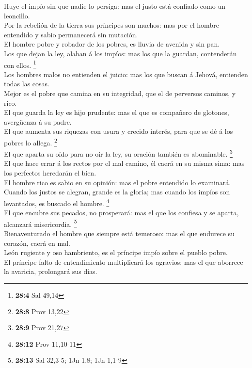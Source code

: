  Huye el impío sin que nadie lo persiga: mas el justo está
confiado como un leoncillo.\\
 Por la rebelión de la tierra sus príncipes son muchos: mas
por el hombre entendido y sabio permanecerá sin mutación.\\
 El hombre pobre y robador de los pobres, es lluvia de
avenida y sin pan.\\
 Los que dejan la ley, alaban á los impíos: mas los que la
guardan, contenderán con ellos. \footnote{\textbf{28:4} Sal 49,14}\\
 Los hombres malos no entienden el juicio: mas los que
buscan á Jehová, entienden todas las cosas.\\
 Mejor es el pobre que camina en su integridad, que el de
perversos caminos, y rico.\\
 El que guarda la ley es hijo prudente: mas el que es
compañero de glotones, avergüenza á su padre.\\
 El que aumenta sus riquezas con usura y crecido interés,
para que se dé á los pobres lo allega. \footnote{\textbf{28:8} Prov
  13,22}\\
 El que aparta su oído para no oir la ley, su oración
también es abominable. \footnote{\textbf{28:9} Prov 21,27}\\
 El que hace errar á los rectos por el mal camino, él caerá
en su misma sima: mas los perfectos heredarán el bien.\\
 El hombre rico es sabio en su opinión: mas el pobre
entendido lo examinará.\\
 Cuando los justos se alegran, grande es la gloria; mas
cuando los impíos son levantados, es buscado el hombre. \footnote{\textbf{28:12}
  Prov 11,10-11}\\
 El que encubre sus pecados, no prosperará: mas el que los
confiesa y se aparta, alcanzará misericordia. \footnote{\textbf{28:13}
  Sal 32,3-5; 1Jn 1,8; 1Jn 1,1-9}\\
 Bienaventurado el hombre que siempre está temeroso: mas el
que endurece su corazón, caerá en mal.\\
 León rugiente y oso hambriento, es el príncipe impío sobre
el pueblo pobre.\\
 El príncipe falto de entendimiento multiplicará los
agravios: mas el que aborrece la avaricia, prolongará sus días.\\
